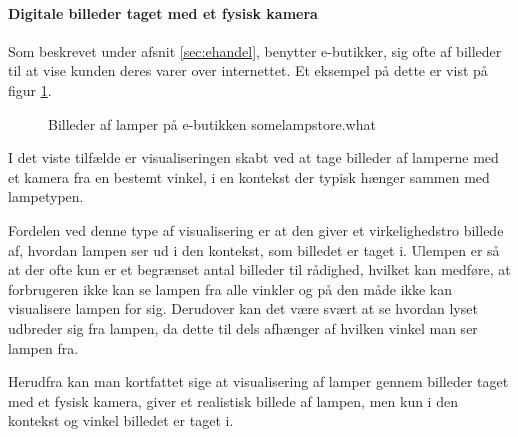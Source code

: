 \paragraph{Digitale billeder taget med et fysisk kamera}
Som beskrevet under afsnit \ref{sec:ehandel}, benytter e-butikker, sig ofte af billeder til at vise kunden deres varer over internettet. Et eksempel på dette er vist på figur \ref{fig:e_handel_lampebilleder}.

\begin{figure}[H]
    \centering
    \label{fig:e_handel_lampebilleder}
    \fbox{\rule{\textwidth}{5cm}}
    \caption{Billeder af lamper på e-butikken somelampstore.what}
\end{figure} 

I det viste tilfælde er visualiseringen skabt ved at tage billeder af lamperne med et kamera fra en bestemt vinkel, i en kontekst der typisk hænger sammen med lampetypen. 

Fordelen ved denne type af visualisering er at den giver et virkelighedstro billede af, hvordan lampen ser ud i den kontekst, som billedet er taget i. Ulempen er så at der ofte kun er et begrænset antal billeder til rådighed, hvilket kan medføre, at forbrugeren ikke kan se lampen fra alle vinkler og på den måde ikke kan visualisere lampen for sig. Derudover kan det være svært at se hvordan lyset udbreder sig fra lampen, da dette til dels afhænger af hvilken vinkel man ser lampen fra. 

Herudfra kan man kortfattet sige at visualisering af lamper gennem billeder taget med et fysisk kamera, giver et realistisk billede af lampen, men kun i den kontekst og vinkel billedet er taget i. 

